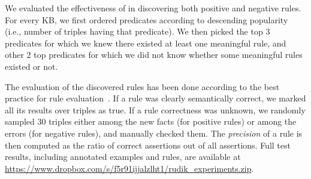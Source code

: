 We evaluated the effectiveness of \krd in discovering both positive and negative rules. 
For every KB, we first ordered predicates according to descending popularity (i.e., number of triples having that predicate). We then picked the top $3$ predicates for which we knew there existed at least one meaningful rule, and other $2$ top predicates for which we did not know whether some meaningful rules existed or not. 

The evaluation of the discovered rules 
has been done according to the best practice for rule evaluation~\cite{galarraga2015fast}. If a rule was clearly semantically correct, we marked all its results over triples as true. If a rule correctness was unknown, we randomly sampled 30 triples either among the new facts (for positive rules) or among the errors (for negative rules), 
and manually checked them. %
The \emph{precision} of a rule is then computed as the ratio of correct assertions out of all assertions. 
Full test results, including annotated examples and rules, are available at \url{https://www.dropbox.com/s/f5r91ijjalzlht1/rudik_experiments.zip}.


